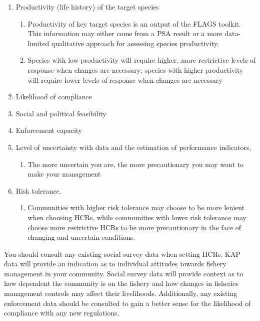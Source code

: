 \documentclass[]{book}
\providecommand{\tightlist}{%
  \setlength{\itemsep}{0pt}\setlength{\parskip}{0pt}}
\begin{document}
\begin{enumerate}
\def\labelenumi{\arabic{enumi}.}
\item
  Productivity (life history) of the target species

  \begin{enumerate}
  \def\labelenumii{\alph{enumii}.}
  \item
    Productivity of key target species is an output of the FLAGS
    toolkit. This information may either come from a PSA result or a
    more data-limited qualitative approach for assessing species
    productivity.
  \item
    Species with low productivity will require higher, more restrictive
    levels of response when changes are necessary; species with higher
    productivity will require lower levels of response when changes are
    necessary
  \end{enumerate}
\item
  Likelihood of compliance
\item
  Social and political feasibility
\item
  Enforcement capacity
\item
  Level of uncertainty with data and the estimation of performance
  indicators,

  \begin{enumerate}
  \def\labelenumii{\alph{enumii}.}
  \tightlist
  \item
    The more uncertain you are, the more precautionary you may want to
    make your management
  \end{enumerate}
\item
  Risk tolerance.

  \begin{enumerate}
  \def\labelenumii{\alph{enumii}.}
  \tightlist
  \item
    Communities with higher risk tolerance may choose to be more lenient
    when choosing HCRs, while communities with lower risk tolerance may
    choose more restrictive HCRs to be more precautionary in the face of
    changing and uncertain conditions.
  \end{enumerate}
\end{enumerate}

You should consult any existing social survey data when setting HCRs.
KAP data will provide an indication as to individual attitudes towards
fishery management in your community. Social survey data will provide
context as to how dependent the community is on the fishery and how
changes in fisheries management controls may affect their livelihoods.
Additionally, any existing enforcement data should be consulted to gain
a better sense for the likelihood of compliance with any new
regulations.
\end{document}
